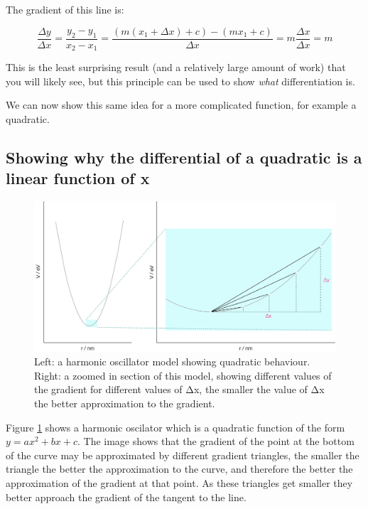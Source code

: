 \documentclass[
]{book}
\begin{document}
The gradient of this line is:

\begin{equation*}
\frac{\Delta y}{\Delta x} = \frac{y_2-y_1}{x_2-x_1}=\frac{(m(x_1+ \Delta x) + c) - (mx_1 + c)}{\Delta x} = m\frac{\Delta x}{\Delta x}=m
\end{equation*}

This is the least surprising result (and a relatively large amount of work) that you will likely see, but this principle can be used to show \emph{what} differentiation is.

We can now show this same idea for a more complicated function, for example a quadratic.

\hypertarget{showing-why-the-differential-of-a-quadratic-is-a-linear-function-of-x}{%
\subsection{Showing why the differential of a quadratic is a linear function of x}\label{showing-why-the-differential-of-a-quadratic-is-a-linear-function-of-x}}

\begin{figure}

{\centering \includegraphics[width=0.8\linewidth]{images/quadratic} 

}

\caption{Left: a harmonic oscillator model showing quadratic behaviour. Right: a zoomed in section of this model, showing different values of the gradient for different values of Δx, the smaller the value of Δx the better approximation to the gradient.}\label{fig:quad}
\end{figure}

Figure \ref{fig:quad} shows a harmonic oscilator which is a quadratic function of the form \(y=ax^2+bx+c\). The image shows that the gradient of the point at the bottom of the curve may be approximated by different gradient triangles, the smaller the triangle the better the approximation to the curve, and therefore the better the approximation of the gradient at that point. As these triangles get smaller they better approach the gradient of the tangent to the line.
\end{document}
